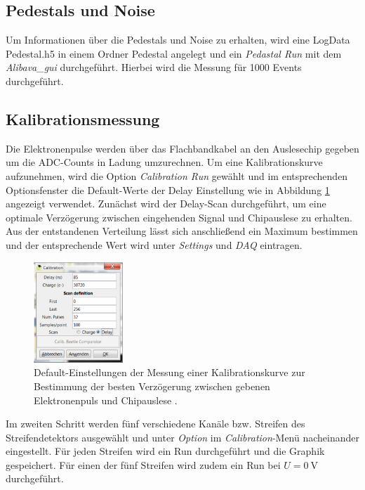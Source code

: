 \subsection{Pedestals und Noise}
\label{sec:Auswertung_Noise}
Um Informationen über die Pedestals und Noise zu erhalten, wird eine LogData Pedestal.h5 in einem Ordner Pedestal angelegt und ein \textit{Pedastal Run} mit dem \textit{Alibava\_gui} durchgeführt. Hierbei wird die Messung für 1000 Events durchgeführt.

\subsection{Kalibrationsmessung}
\label{sec:Kalibrationsmessung}
Die Elektronenpulse werden über das Flachbandkabel an den Auslesechip gegeben um die ADC-Counts in Ladung umzurechnen. Um eine Kalibrationskurve aufzunehmen, wird die Option \textit{Calibration Run} gewählt und im entsprechenden Optionsfenster die Default-Werte der Delay Einstellung wie in Abbildung \ref{fig:calibration-durchfuehrung} angezeigt verwendet. Zunächst wird der Delay-Scan durchgeführt, um eine optimale Verzögerung zwischen eingehenden Signal und Chipauslese zu erhalten. Aus der entstandenen Verteilung lässt sich anschließend ein Maximum bestimmen und der entsprechende Wert wird unter \textit{Settings} und \textit{DAQ} eintragen.\\
\begin{figure}[htb]
  \centering
  \includegraphics[width=0.3\textwidth]{graphics/Calibration.pdf}
  \caption{Default-Einstellungen der Messung einer Kalibrationskurve zur Bestimmung
  der besten Verzögerung zwischen gebenen Elektronenpuls und Chipauslese \cite{anleitung}.}
  \label{fig:calibration-durchfuehrung}
\end{figure}

Im zweiten Schritt werden fünf verschiedene Kanäle bzw. Streifen des Streifendetektors ausgewählt und unter \textit{Option} im \textit{Calibration}-Menü nacheinander eingestellt. Für jeden Streifen wird ein Run durchgeführt und die Graphik gespeichert. Für einen der fünf Streifen wird zudem ein Run bei $U=\SI{0}{\volt}$ durchgeführt.

